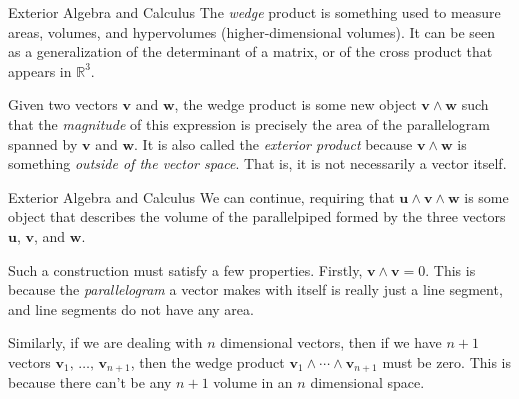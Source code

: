 \documentclass{beamer}
\begin{document}
    \begin{frame}{Exterior Algebra and Calculus}
        The \textit{wedge} product is something used to measure areas, volumes,
        and hypervolumes (higher-dimensional volumes). It can be seen as a
        generalization of the determinant of a matrix, or of the cross product
        that appears in $\mathbb{R}^{3}$.
        \par\hfill\par
        Given two vectors $\mathbf{v}$ and $\mathbf{w}$, the wedge product is
        some new object $\mathbf{v}\land\mathbf{w}$ such that the
        \textit{magnitude} of this expression is precisely the area of the
        parallelogram spanned by $\mathbf{v}$ and $\mathbf{w}$.
        It is also called
        the \textit{exterior product} because $\mathbf{v}\land\mathbf{w}$ is
        something \textit{outside of the vector space}. That is, it is not
        necessarily a vector itself.
    \end{frame}
    \begin{frame}{Exterior Algebra and Calculus}
        We can continue, requiring that
        $\mathbf{u}\land\mathbf{v}\land\mathbf{w}$
        is some object that describes the volume of the
        parallelpiped formed by the
        three vectors $\mathbf{u}$, $\mathbf{v}$, and $\mathbf{w}$.
        \par\hfill\par
        Such a construction must satisfy a few properties. Firstly,
        $\mathbf{v}\land\mathbf{v}=0$.
        This is because the \textit{parallelogram}
        a vector makes with itself is really just a line segment, and line
        segments do not have any area.
        \par\hfill\par
        Similarly, if we are dealing with $n$ dimensional vectors,
        then if we have
        $n+1$ vectors $\mathbf{v}_{1},\,\dots,\,\mathbf{v}_{n+1}$, then the
        wedge product $\mathbf{v}_{1}\land\cdots\land\mathbf{v}_{n+1}$ must be
        zero. This is because there can't be any $n+1$ volume in an
        $n$ dimensional space.
    \end{frame}
\end{document}
